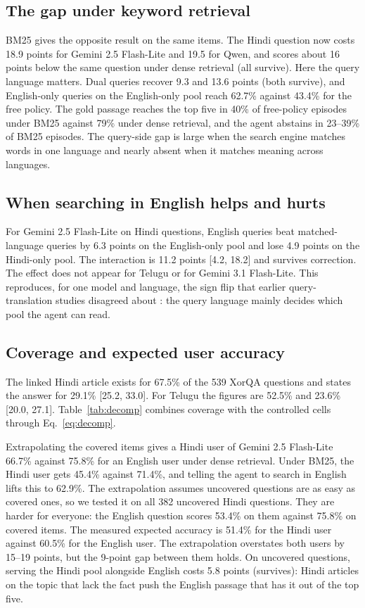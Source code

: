\subsection{The gap under keyword retrieval}
\label{sec:results-bm25}
BM25 gives the opposite result on the same items. The Hindi question now costs 18.9 points for Gemini 2.5 Flash-Lite and 19.5 for Qwen, and scores about 16 points below the same question under dense retrieval (all survive). Here the query language matters. Dual queries recover 9.3 and 13.6 points (both survive), and English-only queries on the English-only pool reach 62.7\% against 43.4\% for the free policy. The gold passage reaches the top five in 40\% of free-policy episodes under BM25 against 79\% under dense retrieval, and the agent abstains in 23--39\% of BM25 episodes. The query-side gap is large when the search engine matches words in one language and nearly absent when it matches meaning across languages.

\subsection{When searching in English helps and hurts}
\label{sec:results-interaction}
For Gemini 2.5 Flash-Lite on Hindi questions, English queries beat matched-language queries by 6.3 points on the English-only pool and lose 4.9 points on the Hindi-only pool. The interaction is 11.2 points [4.2, 18.2] and survives correction. The effect does not appear for Telugu or for Gemini 3.1 Flash-Lite. This reproduces, for one model and language, the sign flip that earlier query-translation studies disagreed about \citep{a2507_07543,a2504_03616}: the query language mainly decides which pool the agent can read.

\subsection{Coverage and expected user accuracy}
\label{sec:results-decomp}
The linked Hindi article exists for 67.5\% of the 539 XorQA questions and states the answer for 29.1\% [25.2, 33.0]. For Telugu the figures are 52.5\% and 23.6\% [20.0, 27.1]. Table~\ref{tab:decomp} combines coverage with the controlled cells through Eq.~\ref{eq:decomp}.

Extrapolating the covered items gives a Hindi user of Gemini 2.5 Flash-Lite 66.7\% against 75.8\% for an English user under dense retrieval. Under BM25, the Hindi user gets 45.4\% against 71.4\%, and telling the agent to search in English lifts this to 62.9\%. The extrapolation assumes uncovered questions are as easy as covered ones, so we tested it on all 382 uncovered Hindi questions. They are harder for everyone: the English question scores 53.4\% on them against 75.8\% on covered items. The measured expected accuracy is 51.4\% for the Hindi user against 60.5\% for the English user. The extrapolation overstates both users by 15--19 points, but the 9-point gap between them holds. On uncovered questions, serving the Hindi pool alongside English costs 5.8 points (survives): Hindi articles on the topic that lack the fact push the English passage that has it out of the top five.

